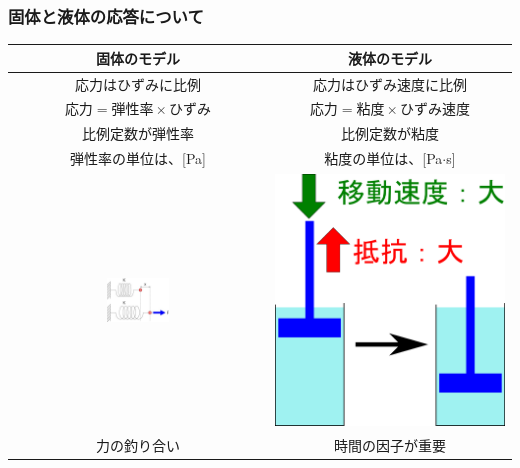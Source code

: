 \documentclass[12pt, dvipdfmx]{beamer}
\begin{document}
\begin{frame}
	\frametitle{固体と液体の応答について}
			\begin{center}
				\begin{tabular}{|c||c|} \hline
					固体のモデル	& 液体のモデル \\ \hline \hline
					応力は\alert{ひずみに比例}	& 応力は\alert{ひずみ速度に比例}\\
					$\text{応力} = \text{弾性率} \times \text{ひずみ}$	& $\text{応力} = \text{粘度} \times \text{ひずみ速度}$ \\ \hline
					比例定数が弾性率	& 比例定数が粘度\\ 
					弾性率の単位は、[Pa]	& 粘度の単位は、[Pa$\cdot$s]\\ \hline
					\includegraphics[width= 0.25\textwidth]{spring.png} & \includegraphics[width=.25\textwidth]{dashpot.png} \\ \hline
					\alert{力の釣り合い}	& 	\alert{時間の因子が重要} \\ \hline
				\end{tabular}
			\end{center}
\end{frame}
\end{document}
